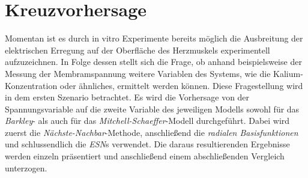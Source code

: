 \section{Kreuzvorhersage}
\label{sec:exp_cross_pred}
Momentan ist es durch in vitro Experimente bereits möglich die Ausbreitung der elektrischen Erregung auf der Oberfläche des Herzmuskels experimentell aufzuzeichnen. In Folge dessen stellt sich die Frage, ob anhand beispielsweise der Messung der Membramspannung weitere Variablen des Systems, wie die Kalium-Konzentration oder ähnliches, ermittelt werden können. Diese Fragestellung wird in dem ersten Szenario betrachtet. Es wird die Vorhersage von der Spannungsvariable auf die zweite Variable des jeweiligen Modells sowohl für das \textit{Barkley}- als auch für das \textit{Mitchell-Schaeffer}-Modell durchgeführt. Dabei wird zuerst die \textit{Nächste-Nachbar}-Methode, anschließend die \textit{radialen Basisfunktionen} und schlussendlich die \textit{ESN}s verwendet. Die daraus resultierenden Ergebnisse werden einzeln präsentiert und anschließend einem abschließenden Vergleich unterzogen.
 
